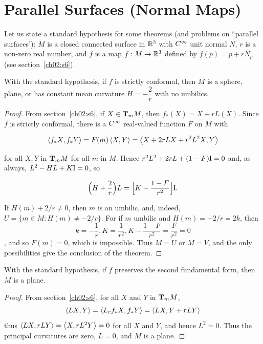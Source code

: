 \documentclass[../main]{subfiles}
\begin{document}
\section{Parallel Surfaces (Normal Maps)}\label{ch03:s3}
Let us state a standard hypothesis for some theorems (and problems on ``parallel surfaces'): $M$ is a closed connected surface in $\bbR^3$ with $\CInfty$ unit normal $N$, $r$ is a non-zero real number, and $f$ is a map $f : M \functionMaps \bbR^3$ defined by $f(p) = p + rN_p$ (see section~\ref{ch02:s6}).


\begin{theorem} \label{thm:ch3.3.1}
With the standard hypothesis, if $f$ is strictly conformal, then $M$ is a sphere, plane, or has constant mean curvature $H = -\dfrac{2}{r}$ with no umbilics. 
\end{theorem}

\begin{proof}
From section~\ref{ch02:s6}, if $X \in \tangentspace M m$, then $f_\ast(X) = X + r L(X)$. Since $f$ is strictly conformal, there is a $\CInfty$ real-valued function $F$ on $M$ with 

\[
\ip {f_\ast X} {f_\ast Y} = F(m) \ip X Y = \ip {X + 2 r L X + r^2 L^2 X} Y
\]

for all $X, Y$ in $\tangentspace M m$ for all $m$ in $M$. Hence $r^2 L^2 + 2 r L + (1 - F) \firstForm = 0$ and, as always, $L^2 - HL + K\firstForm = 0$, so 

\[
\Big(H + \dfrac{2}{r}\Big)L = \Big[K -\dfrac{1 - F}{r^2}\Big] \firstForm.
\]

If $H(m) + 2/r \ne 0$, then $m$ is an umbilic, and, indeed, \newline $U = \{m \in M : H(m) \ne -2/r\}$. For if $m$ umbilic and $H(m) = -2/r = 2k$, then \[k = -\dfrac{1}{r},K = \dfrac{1}{r^2},K - \dfrac{1 - F}{r^2} = \dfrac{F}{r^2} = 0\], and so $F(m) = 0$, which is impossible. Thus $M = U$ or $M = V$, and the only possibilities give the conclusion of the theorem.
\end{proof}



\begin{theorem} \label{thm:ch3.3.2}
With the standard hypothesis, if $f$ preserves the second fundamental form, then $M$ is a plane. 
\end{theorem}

\begin{proof}
From section~\ref{ch02:s6}, for all $X$ and $Y$ in $\tangentspace M m$, 
\[
\ip {LX} Y = \ip {L_r f_\ast X} {f_\ast Y} = \ip {L X} {Y + r LY}
\]
thus $\ip {LX} {r LY} = \ip X {r L^2 Y} = 0$ for all $X$ and $Y$, and hence $L^2 = 0$. Thus the principal curvatures are zero, $L = 0$, and $M$ is a plane. 
\end{proof}
\end{document}
